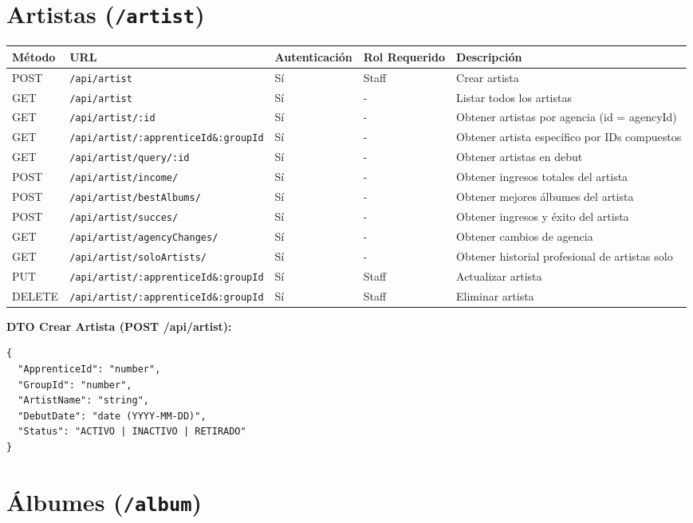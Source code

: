 \documentclass[11pt]{article}
\begin{document}
\section{Artistas (\texttt{/artist})}

\begin{longtable}{lllll}
\toprule
\textbf{Método} & \textbf{URL} & \textbf{Autenticación} & \textbf{Rol Requerido} & \textbf{Descripción} \\
\midrule
\endhead
POST & \texttt{/api/artist} & Sí & Staff & Crear artista \\
GET & \texttt{/api/artist} & Sí & - & Listar todos los artistas \\
GET & \texttt{/api/artist/:id} & Sí & - & Obtener artistas por agencia (id = agencyId) \\
GET & \texttt{/api/artist/:apprenticeId\&:groupId} & Sí & - & Obtener artista específico por IDs compuestos \\
GET & \texttt{/api/artist/query/:id} & Sí & - & Obtener artistas en debut \\
POST & \texttt{/api/artist/income/} & Sí & - & Obtener ingresos totales del artista \\
POST & \texttt{/api/artist/bestAlbums/} & Sí & - & Obtener mejores álbumes del artista \\
POST & \texttt{/api/artist/succes/} & Sí & - & Obtener ingresos y éxito del artista \\
GET & \texttt{/api/artist/agencyChanges/} & Sí & - & Obtener cambios de agencia \\
GET & \texttt{/api/artist/soloArtists/} & Sí & - & Obtener historial profesional de artistas solo \\
PUT & \texttt{/api/artist/:apprenticeId\&:groupId} & Sí & Staff & Actualizar artista \\
DELETE & \texttt{/api/artist/:apprenticeId\&:groupId} & Sí & Staff & Eliminar artista \\
\bottomrule
\end{longtable}

\textbf{DTO Crear Artista (POST /api/artist):}
\begin{Verbatim}
{
  "ApprenticeId": "number",
  "GroupId": "number",
  "ArtistName": "string",
  "DebutDate": "date (YYYY-MM-DD)",
  "Status": "ACTIVO | INACTIVO | RETIRADO"
}
\end{Verbatim}

\section{Álbumes (\texttt{/album})}
\end{document}
